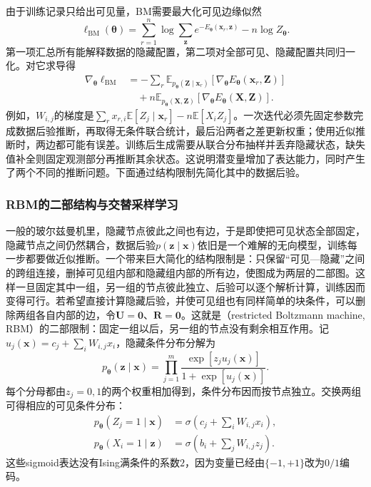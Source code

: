 由于训练记录只给出可见量，BM需要最大化可见边缘似然
\begin{equation}
  \ell_{\mathrm{BM}}(\bm{\theta})
    =\sum_{r=1}^n\log\sum_{\bm{z}}
                e^{-E_{\bm{\theta}}(\bm{x}_r,\bm{z})}
      -n\log Z_{\bm{\theta}}.
  \label{eq:pgm-energy-models-bm-likelihood}
\end{equation}
第一项汇总所有能解释数据的隐藏配置，第二项对全部可见、隐藏配置共同归一化。对它求导得
\[
  \begin{aligned}
  \nabla_{\bm{\theta}}\ell_{\mathrm{BM}}
    &=-\sum_r\mathbb{E}_{p_{\bm{\theta}}(\bm{Z}\mid\bm{x}_r)}
           [\nabla_{\bm{\theta}}E_{\bm{\theta}}(\bm{x}_r,\bm{Z})]\\
    &\quad+n\mathbb{E}_{p_{\bm{\theta}}(\bm{X},\bm{Z})}
           [\nabla_{\bm{\theta}}E_{\bm{\theta}}(\bm{X},\bm{Z})].
  \end{aligned}
\]
例如，$W_{i,j}$的梯度是$\sum_r x_{r,i}\mathbb{E}[Z_j\mid\bm{x}_r]-n\mathbb{E}[X_iZ_j]$。一次迭代必须先固定参数完成数据后验推断，再取得无条件联合统计，最后沿两者之差更新权重；使用近似推断时，两边都可能有误差。训练后生成需要从联合分布抽样并丢弃隐藏状态，缺失值补全则固定观测部分再推断其余状态。这说明潜变量增加了表达能力，同时产生了两个不同的推断问题。下面通过结构限制先简化其中的数据后验。

\subsubsection{RBM的二部结构与交替采样学习}
\label{sec:pgm-energy-models-rbm}

一般的玻尔兹曼机里，隐藏节点彼此之间也有边，于是即使把可见状态全部固定，隐藏节点之间仍然耦合，数据后验$p(\bm z\mid\bm x)$依旧是一个难解的无向模型，训练每一步都要做近似推断。一个带来巨大简化的结构限制是：只保留“可见—隐藏”之间的跨组连接，删掉可见组内部和隐藏组内部的所有边，使图成为两层的二部图。这样一旦固定其中一组，另一组的节点彼此独立、后验可以逐个解析计算，训练因而变得可行。若希望直接计算隐藏后验，并使可见组也有同样简单的块条件，可以删除两组各自内部的边，令$\bm{U}=\bm{0}$、$\bm{R}=\bm{0}$。这就是（restricted Boltzmann machine, RBM）的二部限制：固定一组以后，另一组的节点没有剩余相互作用。记$u_j(\bm{x})=c_j+\sum_iW_{i,j}x_i$，隐藏条件分布分解为
\[
  p_{\bm{\theta}}(\bm{z}\mid\bm{x})
   =\prod_{j=1}^m\frac{\exp[z_ju_j(\bm{x})]}
                         {1+\exp[u_j(\bm{x})]}.
\]
每个分母都由$z_j=0,1$的两个权重相加得到，条件分布因而按节点独立。交换两组可得相应的可见条件分布：
\begin{equation}
  \begin{aligned}
    p_{\bm{\theta}}(Z_j=1\mid\bm{x})
      &=\sigma\!\left(c_j+\sum_iW_{i,j}x_i\right),\\
    p_{\bm{\theta}}(X_i=1\mid\bm{z})
      &=\sigma\!\left(b_i+\sum_jW_{i,j}z_j\right).
  \end{aligned}
  \label{eq:pgm-energy-models-rbm-conditionals}
\end{equation}
这些sigmoid表达没有Ising满条件的系数$2$，因为变量已经由$\{-1,+1\}$改为$0/1$编码。

